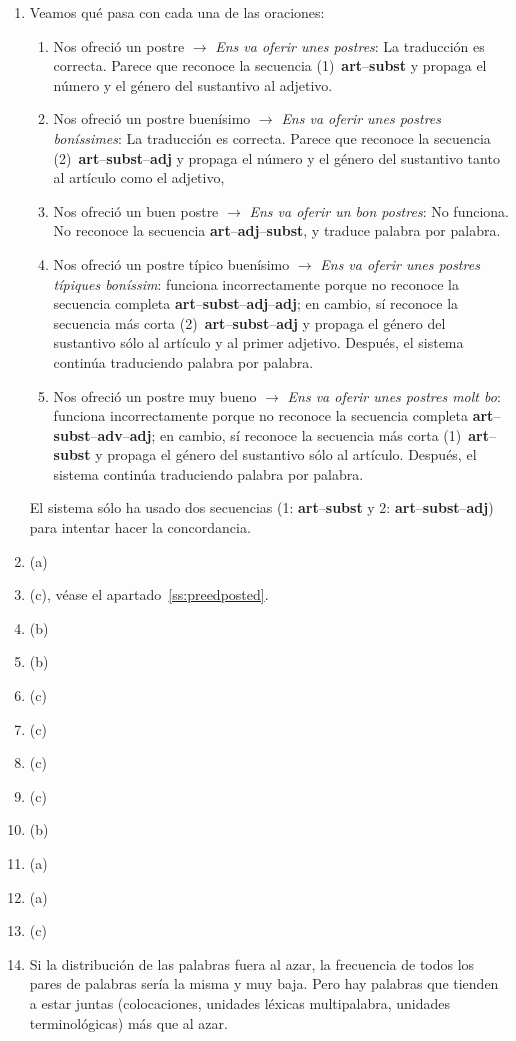 \begin{enumerate}
\item Veamos qué pasa con cada una de las oraciones: \begin{enumerate} \item {\sf Nos ofreció un postre} $\rightarrow$ {\em Ens va oferir unes postres\/}: La traducción es correcta. Parece que reconoce la secuencia (1)~\textbf{art}--\textbf{subst} y propaga el número y el género del sustantivo al adjetivo. \item {\sf Nos ofreció un postre buenísimo} $\rightarrow$ {\em Ens va oferir unes postres boníssimes\/}: La traducción es correcta. Parece que reconoce la secuencia (2)~\textbf{art}--\textbf{subst}--\textbf{adj} y propaga el número y el género del sustantivo tanto al artículo como el adjetivo, \item {\sf Nos ofreció un buen postre} $\rightarrow$ {\em *Ens va oferir un bon postres}: No funciona. No reconoce la secuencia \textbf{art}--\textbf{adj}--\textbf{subst}, y traduce palabra por palabra. \item {\sf Nos ofreció un postre típico buenísimo\/} $\rightarrow$ {\em *Ens va oferir unes postres típiques boníssim}: funciona incorrectamente porque no reconoce la secuencia completa \textbf{art}--\textbf{subst}--\textbf{adj}--\textbf{adj}; en cambio, sí reconoce la secuencia más corta (2)~\textbf{art}--\textbf{subst}--\textbf{adj} y propaga el género del sustantivo sólo al artículo y al primer adjetivo. Después, el sistema continúa traduciendo palabra por palabra. \item {\sf Nos ofreció un postre muy bueno} $\rightarrow$ {\em *Ens va oferir unes postres molt bo\/}: funciona incorrectamente porque no reconoce la secuencia completa {\bf art}--{\bf subst}--{\bf adv}--{\bf adj}; en cambio, sí reconoce la secuencia más corta (1)~\textbf{art}--\textbf{subst} y propaga el género del sustantivo sólo al artículo. Después, el sistema continúa traduciendo palabra por palabra. \end{enumerate} El sistema sólo ha usado dos secuencias (1: {\bf art}--{\bf subst} y 2: {\bf art}--{\bf subst}--{\bf adj}) para intentar hacer la concordancia. 

\item (a) \item (c), véase el apartado~\ref{ss:preedposted}. \item (b) \item (b) \item (c) \item (c) 

\item (c) \item (c) \item (b) \item (a) \item (a) \item (c) \item Si la distribución de las palabras fuera al azar, la frecuencia de todos los pares de palabras sería la misma y muy baja. Pero hay palabras que tienden a estar juntas (colocaciones, unidades léxicas multipalabra, unidades terminológicas) más que al azar. 


\end{enumerate}
